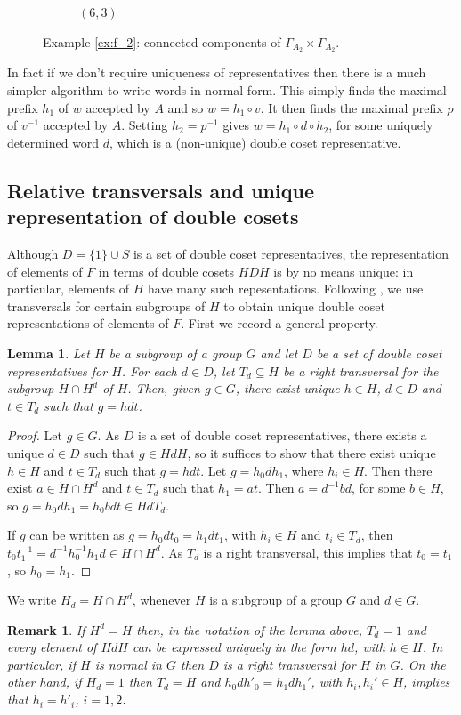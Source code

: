 \documentclass[a4paper,12pt]{article}
\newcommand{\G}{\Gamma }
\newtheorem{lemma}[theorem]{Lemma}
\newtheorem{remk}[theorem]{Remark}
\newenvironment{remark}{\begin{remk} \rm}{\end{remk}}
\numberwithin{equation}{section}
\numberwithin{figure}{section}
\begin{document}
\begin{figure}
\begin{center}
\begin{subfigure}[b]{.13\columnwidth}
\caption{$(6,3)$}
\label{fig:G2xG2-2-6}
\end{subfigure}
\end{center}
\caption{Example \ref{ex:f_2}: connected components of $\G_{A_2}\times \G_{A_2}$.}\label{fig:G2xG2-2}
\end{figure}

In fact if we don't require uniqueness of representatives then
there is a much simpler algorithm to write words in normal form.
This simply finds the maximal prefix $h_1$ of $w$  accepted  by
$A$  and so $w=h_1\circ v$. It then finds the maximal prefix $p$
of $v^{-1}$ accepted by $A$. Setting $h_2=p^{-1}$ gives
$w=h_1\circ d \circ h_2$, for some uniquely determined word $d$,
which is a (non-unique) double coset representative.
\subsection{Relative transversals and unique representation of 
double cosets}\label{sub:reltran}
Although $D=\{1\}\cup S$ is a set of double coset representatives, the 
representation of elements of $F$ in terms of double cosets $HDH$ is by 
no means unique: in particular, elements of $H$ have many such repesentations. 
Following \cite{FrenkelRemeslennikov13}, we use transversals for certain subgroups of $H$ to 
obtain unique double coset representations of elements of $F$. 
First we record a general property.  
\begin{lemma}\label{lem:dcrel}
Let $H$ be a subgroup of a group $G$ and let $D$ be a set of
double coset representatives for $H$. For each $d\in D$, let 
$T_d\subseteq H$ be a right transversal for the subgroup $H\cap H^d$ of $H$.
Then, given $g\in G$, there exist  unique $h\in H$, $d\in D$ and 
$t\in T_d$ such that  $g=hdt$. 
\end{lemma}
\begin{proof}
Let $g\in G$. As $D$ is a set of double coset representatives, there
exists a unique $d\in D$ such that $g\in HdH$, so it suffices to
show that there exist unique $h\in H$ and $t\in T_d$ such that 
$g=hdt$. Let $g=h_0dh_1$, where $h_i\in H$. Then there exist $a\in H\cap H^d$ 
and   $t\in T_d$ such that $h_1=at$. Then $a=d^{-1}bd$, for some $b\in H$,
so $g=h_0dh_1=h_0bdt\in HdT_d$. 

If $g$ can be written as  $g=h_0dt_0=h_1dt_1$, with $h_i\in H$ and 
$t_i\in T_d$, then $t_0t_1^{-1}=d^{-1}h_0^{-1}h_1d\in H\cap H^d$. As 
$T_d$ is a right transversal, this implies that $t_0=t_1$, so $h_0=h_1$. 
\end{proof}
We write  $H_d=H\cap H^d$, whenever $H$ is a subgroup of a group $G$ and
$d\in G$. 
\begin{remark}
If $H^d=H$ then, in the notation of the lemma above, $T_d=1$ and 
every element of $HdH$ can be expressed uniquely in the form $hd$, 
with $h\in H$. In particular, if $H$ is normal in $G$ then $D$ is 
a right transversal for $H$ in $G$. On the other hand, if $H_d=1$ then
$T_d=H$ and $h_0dh'_0=h_1dh_1'$, with $h_i,h_i'\in H$, implies that 
$h_i=h'_i$, $i=1,2$. 
\end{remark}   
\end{document}
